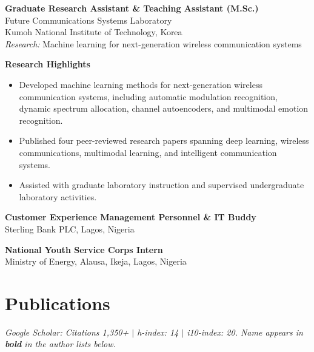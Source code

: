 \documentclass[11pt, letterpaper]{article}
\newcommand{\entry}[2]{%
  \begin{list}{}{%
    \setlength{\leftmargin}{0.17\linewidth}%
    \setlength{\labelwidth}{0.15\linewidth}%
    \setlength{\labelsep}{0.02\linewidth}%
    \setlength{\topsep}{3pt}%
    \setlength{\parsep}{2pt}%
    \setlength{\itemsep}{0pt}%
    \renewcommand{\makelabel}[1]{\parbox[t]{0.15\linewidth}{\small\raggedright\color{uwred}##1}\hfill}%
  }%
  \item[{#1}] #2%
  \end{list}%
}
\newcommand{\role}[1]{{\color{uwred}\textbf{#1}}}
\newcommand{\research}[1]{{\color{uwred}\textit{Research:}} #1}
\begin{document}
\entry{Sep 2019 --\\Aug 2021}{%
  \role{Graduate Research Assistant \& Teaching Assistant (M.Sc.)}\\
  Future Communications Systems Laboratory\\
  Kumoh National Institute of Technology, Korea\\
  \research{Machine learning for next-generation wireless communication systems}

  \textbf{Research Highlights}
  \begin{itemize}
      \item Developed machine learning methods for next-generation wireless communication systems, including automatic modulation recognition, dynamic spectrum allocation, channel autoencoders, and multimodal emotion recognition.
      \item Published four peer-reviewed research papers spanning deep learning, wireless communications, multimodal learning, and intelligent communication systems.
      \item Assisted with graduate laboratory instruction and supervised undergraduate laboratory activities.
  \end{itemize}
}

\entry{Apr 2017 --\\Jul 2019}{%
  \role{Customer Experience Management Personnel \& IT Buddy}\\
  Sterling Bank PLC, Lagos, Nigeria
}

\entry{Nov 2015 --\\Oct 2016}{%
  \role{National Youth Service Corps Intern}\\
  Ministry of Energy, Alausa, Ikeja, Lagos, Nigeria
}


\section{Publications}

\noindent\textit{Google Scholar: Citations 1,350+ $\mid$ h-index: 14 $\mid$ i10-index: 20. Name appears in \textbf{bold} in the author lists below.}



\printbibliography[heading={subbibliography},
                   title={Peer-Reviewed Journal Articles},
                   type=article]

\printbibliography[heading={subbibliography},
                   title={International Conference Proceedings},
                   type=inproceedings,
                   notkeyword={domestic}]
\end{document}
